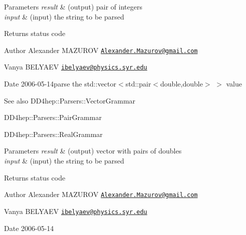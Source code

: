 \begin{DoxyParams}{Parameters}
{\em result} & (output) pair of integers \\
\hline
{\em input} & (input) the string to be parsed \\
\hline
\end{DoxyParams}
\begin{DoxyReturn}{Returns}
status code
\end{DoxyReturn}
\begin{DoxyAuthor}{Author}
Alexander M\+A\+Z\+U\+R\+OV \href{mailto:Alexander.Mazurov@gmail.com}{\tt Alexander.\+Mazurov@gmail.\+com} 

Vanya B\+E\+L\+Y\+A\+EV \href{mailto:ibelyaev@physics.syr.edu}{\tt ibelyaev@physics.\+syr.\+edu} 
\end{DoxyAuthor}
\begin{DoxyDate}{Date}
2006-\/05-\/14parse the {\ttfamily std\+::vector$<$std\+::pair$<$double,double$>$ $>$} value 
\end{DoxyDate}
\begin{DoxySeeAlso}{See also}
D\+D4hep\+::\+Parsers\+::\+Vector\+Grammar 

D\+D4hep\+::\+Parsers\+::\+Pair\+Grammar 

D\+D4hep\+::\+Parsers\+::\+Real\+Grammar 
\end{DoxySeeAlso}

\begin{DoxyParams}{Parameters}
{\em result} & (output) vector with pairs of doubles \\
\hline
{\em input} & (input) the string to be parsed \\
\hline
\end{DoxyParams}
\begin{DoxyReturn}{Returns}
status code
\end{DoxyReturn}
\begin{DoxyAuthor}{Author}
Alexander M\+A\+Z\+U\+R\+OV \href{mailto:Alexander.Mazurov@gmail.com}{\tt Alexander.\+Mazurov@gmail.\+com} 

Vanya B\+E\+L\+Y\+A\+EV \href{mailto:ibelyaev@physics.syr.edu}{\tt ibelyaev@physics.\+syr.\+edu} 
\end{DoxyAuthor}
\begin{DoxyDate}{Date}
2006-\/05-\/14 
\end{DoxyDate}
\hypertarget{namespace_d_d4hep_1_1_parsers_a300ef2062786116541bef473b809ee22}{}\label{namespace_d_d4hep_1_1_parsers_a300ef2062786116541bef473b809ee22} 
